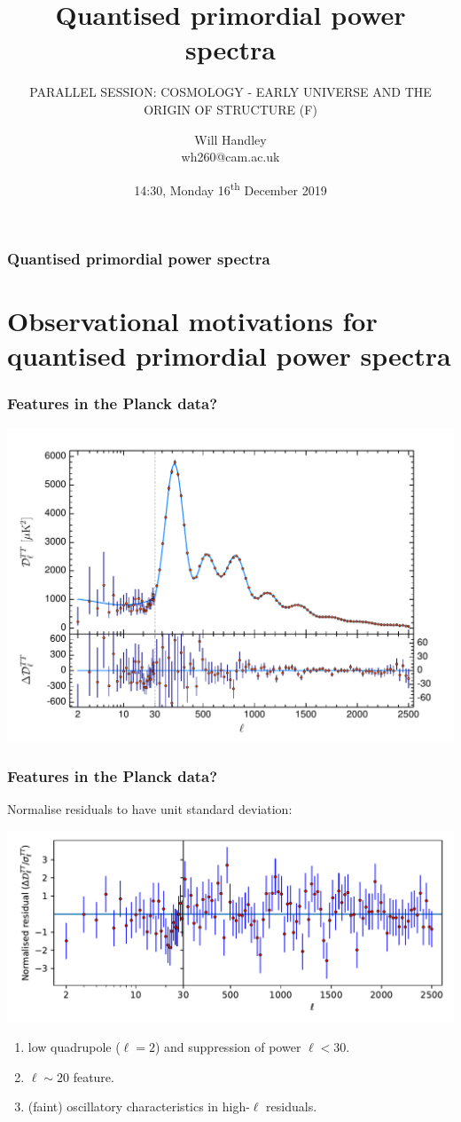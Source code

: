 \documentclass[%
]{beamer}
\title{Quantised primordial power spectra}
\subtitle{\tiny PARALLEL SESSION: COSMOLOGY - EARLY UNIVERSE AND THE ORIGIN OF STRUCTURE (F)}
\author[Handley] %
{Will Handley\\ \small{wh260@cam.ac.uk}}
\institute[University of Cambridge] %
{%
Kavli Institute for Cosmology \\
Astrophysics Group \\
Cavendish Laboratory \\
University of Cambridge
}
\date{14:30, Monday 16\textsuperscript{th} December 2019}
\begin{document}
\begin{frame}
  \titlepage
\end{frame}


\begin{frame}
\frametitle{Quantised primordial power spectra}
\tableofcontents
\end{frame}

\section{Observational motivations for quantised primordial power spectra}
\begin{frame}
    \frametitle{Features in the Planck data?}
    \includegraphics[width=\textwidth]{coadded_TT}
\end{frame}

\begin{frame}
    \frametitle{Features in the Planck data?}
    Normalise residuals to have unit standard deviation:

    \includegraphics[width=\textwidth]{residuals}

    \begin{enumerate}
        \item low quadrupole ($\ell=2$) and suppression of power $\ell<30$.
        \item $\ell\sim20$ feature.
        \item (faint) oscillatory characteristics in high-$\ell$ residuals.
    \end{enumerate}
\end{frame}
\end{document}
